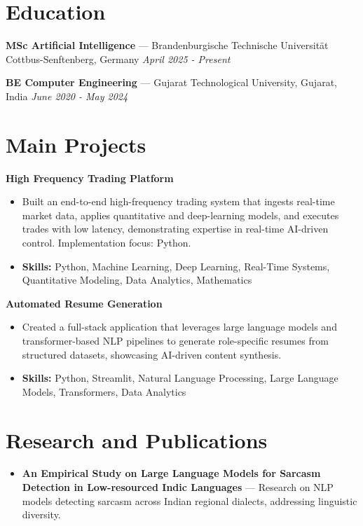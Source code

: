 \documentclass[a4paper,10pt]{article}
\begin{document}
\section*{Education}
\textbf{MSc Artificial Intelligence} — Brandenburgische Technische Universität Cottbus-Senftenberg, Germany \hfill \textit{April 2025 - Present}\par
\vspace{1.5pt}
\textbf{BE Computer Engineering} — Gujarat Technological University, Gujarat, India \hfill \textit{June 2020 - May 2024}\par

\section*{Main Projects}
\textbf{High Frequency Trading Platform}\par
\vspace{1pt}
\begin{itemize}
  \item Built an end-to-end high-frequency trading system that ingests real-time market data, applies quantitative and deep-learning models, and executes trades with low latency, demonstrating expertise in real-time AI-driven control. Implementation focus: Python.
  \item \textbf{Skills:} Python, Machine Learning, Deep Learning, Real-Time Systems, Quantitative Modeling, Data Analytics, Mathematics
\end{itemize}
\vspace{3pt}
\textbf{Automated Resume Generation}\par
\vspace{1pt}
\begin{itemize}
  \item Created a full-stack application that leverages large language models and transformer-based NLP pipelines to generate role-specific resumes from structured datasets, showcasing AI-driven content synthesis.
  \item \textbf{Skills:} Python, Streamlit, Natural Language Processing, Large Language Models, Transformers, Data Analytics
\end{itemize}

\section*{Research and Publications}
\begin{itemize}
\item \textbf{An Empirical Study on Large Language Models for Sarcasm Detection in Low-resourced Indic Languages} — Research on NLP models detecting sarcasm across Indian regional dialects, addressing linguistic diversity.
\end{itemize}
\end{document}
